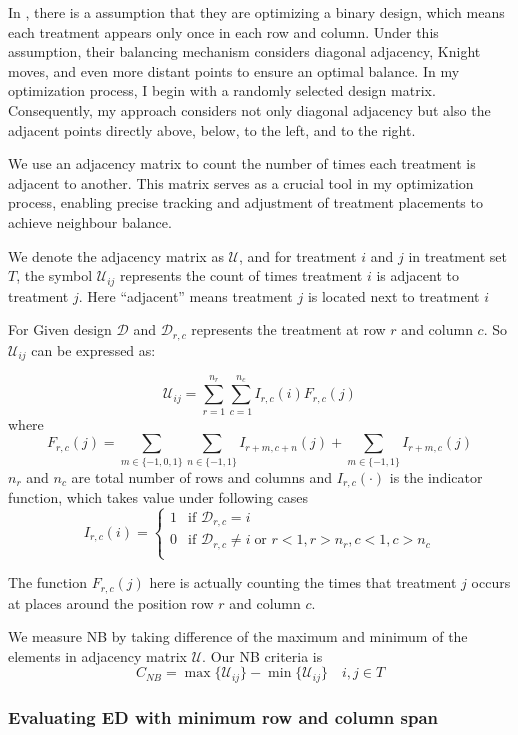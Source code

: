 \documentclass[
  a4paper,
  oneside,
  openany,
  12pt,
  onecolumn]{book}
\theoremstyle{definition}
\theoremstyle{definition}
\theoremstyle{plain}
\theoremstyle{remark}
\begin{document}
In \citet{piepho2018neighbor}, there is a assumption that they are
optimizing a binary design, which means each treatment appears only once
in each row and column. Under this assumption, their balancing mechanism
considers diagonal adjacency, Knight moves, and even more distant points
to ensure an optimal balance. In my optimization process, I begin with a
randomly selected design matrix. Consequently, my approach considers not
only diagonal adjacency but also the adjacent points directly above,
below, to the left, and to the right.

We use an adjacency matrix to count the number of times each treatment
is adjacent to another. This matrix serves as a crucial tool in my
optimization process, enabling precise tracking and adjustment of
treatment placements to achieve neighbour balance.

We denote the adjacency matrix as \(\mathcal{U}\), and for treatment
\(i\) and \(j\) in treatment set \(T\), the symbol \(\mathcal{U}_{ij}\)
represents the count of times treatment \(i\) is adjacent to treatment
\(j\). Here ``adjacent'' means treatment \(j\) is located next to
treatment \(i\)

For Given design \(\mathcal{D}\) and \(\mathcal{D}_{r,c}\) represents
the treatment at row \(r\) and column \(c\). So \(\mathcal{U}_{ij}\) can
be expressed as:

\[
\mathcal{U}_{ij}=\sum_{r=1}^{n_r}\sum_{c=1}^{n_c}I_{r,c}(i) F_{r,c}(j)
\] where \[
F_{r,c}(j)=
\sum_{m \in \{-1,0,1\}}\sum_{n \in \{-1,1\}}I_{r+m,c+n}(j)+\sum_{m \in \{-1,1\}}I_{r+m,c}(j)
\] \(n_r\) and \(n_c\) are total number of rows and columns and
\(I_{r,c}(\cdot)\) is the indicator function, which takes value under
following cases \[
I_{r,c}(i)=
\begin{cases}
1 & \text{if } \mathcal{D}_{r,c}=i \\
0 & \text{if } \mathcal{D}_{r,c}\neq i \; \text{or } r<1,r>n_r,c<1,c>n_c\\
\end{cases}
\]

The function \(F_{r,c}(j)\) here is actually counting the times that
treatment \(j\) occurs at places around the position row \(r\) and
column \(c\).

We measure NB by taking difference of the maximum and minimum of the
elements in adjacency matrix \(\mathcal{U}\). Our NB criteria is \[
C_{NB}=\max\{\mathcal{U}_{ij}\}-\min\{\mathcal{U}_{ij}\}  \quad i,j\in T
\]

\subsubsection{Evaluating ED with minimum row and column
span}\label{evaluating-ed-with-minimum-row-and-column-span}
\end{document}
